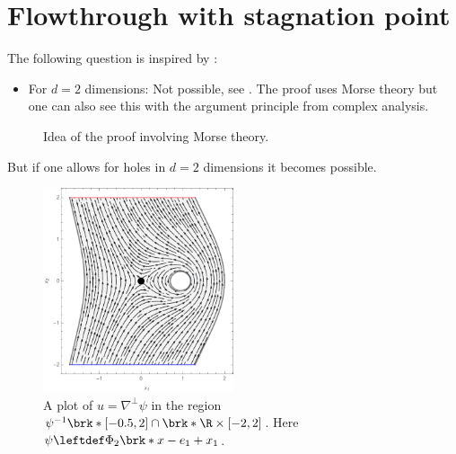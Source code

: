 \section{Flowthrough with stagnation point}

\begin{frame}
  The following question is inspired by \autocite["Existence of threedimensional, steady, inviscid,
  incompressible flows with nonvanishing vorticity"]{Alber1992}:
  \questionFlowthrough
\end{frame}

\begin{frame}

  {}
  \begin{answer}
    \begin{itemize}
      \item For $d=2$ dimensions: Not possible, see \autocite[Prop. 4.1]{Koppenhoefer2024}.
        The proof uses Morse theory but one can also see this with the argument principle from complex analysis.
    \end{itemize}
  \end{answer}
\end{frame}

\begin{frame}
  \begin{figure}
    \centering
    \scalebox{0.7}{}
    \caption{Idea of the proof involving Morse theory.}
  \end{figure}
\end{frame}


\begin{frame}
  But if one allows for holes in $d=2$ dimensions it becomes possible.
  \begin{figure}
    \centering
    \includegraphics[width=0.5\textwidth]{../Plots/n2_hvf_InflowOutflow_asymmetric_gray_2.pdf}
    \caption{A plot of $u=\nabla^\perp\psi$ in the region $\psi^{-1}\brk*{[-0.5,2]}\cap \brk*{\R\times[-2,2]}$.
    Here $\psi\leftdef\Phi_2\brk*{x-e_1}+x_1$.}
    \label{pl:n2_hvf_InflowOutflow_asymmetric_single}
  \end{figure}
\end{frame}

